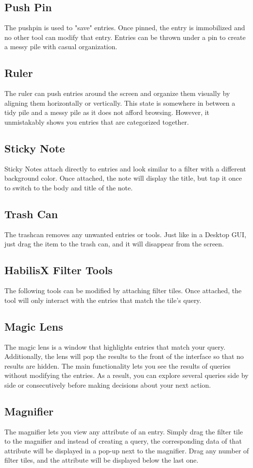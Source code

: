 \documentclass{article}
\begin{document}
\subsection*{Push Pin}
The pushpin is used to "save" entries.  Once pinned, the entry is immobilized and no other tool can modify that entry.  Entries can be thrown under a pin to create a messy pile with casual organization.  
\subsection*{Ruler}
The ruler can push entries around the screen and organize them visually by aligning them horizontally or vertically.  This state is somewhere in between a tidy pile and a messy pile as it does not afford browsing.  However, it unmistakably shows you entries that are categorized together.  
\subsection*{Sticky Note}
Sticky Notes attach directly to entries and look similar to a filter with a different background color.  Once attached, the note will display the title, but tap it once to switch to the body and title of the note.
\subsection*{Trash Can}
The trashcan removes any unwanted entries or tools.  Just like in a Desktop GUI, just drag the item to the trash can, and it will disappear from the screen.  
\subsection{HabilisX Filter Tools}
The following tools can be modified by attaching filter tiles.  Once attached, the tool will only interact with the entries that match the tile's query.  
\subsection*{Magic Lens}
The magic lens is a window that highlights entries that match your query.  Additionally, the lens will pop the results to the front of the interface so that no results are hidden.  The main functionality lets you see the results of queries without modifying the entries.  As a result, you can explore several queries side by side or consecutively before making decisions about your next action.    
\subsection*{Magnifier}
The magnifier lets you view any attribute of an entry.  Simply drag the filter tile to the magnifier and instead of creating a query, the corresponding data of that attribute will be displayed in a pop-up next to the magnifier.  Drag any number of filter tiles, and the attribute will be displayed below the last one.  
\end{document}

